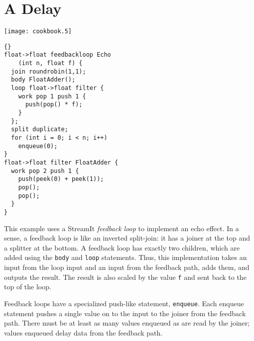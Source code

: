 \section{A Delay}

\begin{textpic}{\texttt{[image: cookbook.5]}}
\begin{lstlisting}{}
float->float feedbackloop Echo
    (int n, float f) {
  join roundrobin(1,1);
  body FloatAdder();
  loop float->float filter {
    work pop 1 push 1 {
      push(pop() * f);
    }
  };
  split duplicate;
  for (int i = 0; i < n; i++)
    enqueue(0);
}
float->float filter FloatAdder {
  work pop 2 push 1 {
    push(peek(0) + peek(1));
    pop();
    pop();
  }
}
\end{lstlisting}
\end{textpic}

This example uses a StreamIt \emph{feedback loop} to implement an echo
effect.  In a sense, a feedback loop is like an inverted split-join:
it has a joiner at the top and a splitter at the bottom.  A feedback
loop has exactly two children, which are added using the \lstinline|body|
and \lstinline|loop| statements.  Thus, this implementation takes an
input from the loop input and an input from the feedback path, adds
them, and outputs the result.  The result is also scaled by the value
\lstinline|f| and sent back to the top of the loop.

Feedback loops have a specialized push-like statement,
\lstinline|enqueue|.  Each enqueue statement pushes a single value on
to the input to the joiner from the feedback path.  There must be at
least as many values enqueued as are read by the joiner; values
enqueued delay data from the feedback path.
